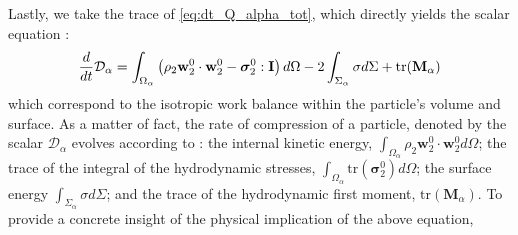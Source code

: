 Lastly, we take the trace of \ref{eq:dt_Q_alpha_tot}, which directly yields the scalar equation :
\begin{equation}
    \frac{d}{d t} \mathcal{D}_\alpha
    = \int_{\Omega_\alpha} \left(
        \rho_2 \textbf{w}_2^0 \cdot \textbf{w}_2^0
        - \bm{\sigma}_2^0 : \textbf{I}
        \right) d\Omega
        - 2\int_{\Sigma_\alpha} \sigma d\Sigma
        + \text{tr}(\textbf{M}_\alpha)
    \label{eq:dt_D_alpha}
\end{equation}
which correspond to the isotropic work balance within the particle's volume and surface. 
As a matter of fact, the rate of compression of a particle, denoted by the scalar $\mathcal{D}_\alpha$ evolves according to : 
the internal kinetic energy, $\int_{\Omega_\alpha}\rho_2 \textbf{w}_2^0 \cdot \textbf{w}_2^0 d\Omega$;
the trace of the integral of the hydrodynamic stresses, $\int_{\Omega_\alpha} \text{tr}(\bm{\sigma}_2^0)d\Omega$; 
the surface energy $\int_{\Sigma_\alpha} \sigma d\Sigma$; 
and the trace of the hydrodynamic first moment, $\text{tr}(\textbf{M}_\alpha)$.
To provide a concrete insight of the physical implication of the above equation, 

